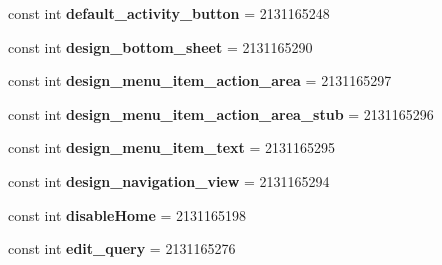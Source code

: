 \begin{DoxyCompactItemize}
\item 
\mbox{\label{class_pinned_app_1_1_droid_1_1_resource_1_1_id_aeffe138f86d5be554298f678e8cdbab4}} 
const int {\bfseries default\+\_\+activity\+\_\+button} = 2131165248
\item 
\mbox{\label{class_pinned_app_1_1_droid_1_1_resource_1_1_id_ab56706c0ed83d92cd51a507f29bf6399}} 
const int {\bfseries design\+\_\+bottom\+\_\+sheet} = 2131165290
\item 
\mbox{\label{class_pinned_app_1_1_droid_1_1_resource_1_1_id_a4d6b1c3ca4eb2c2961a7002a15781aa3}} 
const int {\bfseries design\+\_\+menu\+\_\+item\+\_\+action\+\_\+area} = 2131165297
\item 
\mbox{\label{class_pinned_app_1_1_droid_1_1_resource_1_1_id_a6e06368bdb53b192954d1e686c4df991}} 
const int {\bfseries design\+\_\+menu\+\_\+item\+\_\+action\+\_\+area\+\_\+stub} = 2131165296
\item 
\mbox{\label{class_pinned_app_1_1_droid_1_1_resource_1_1_id_af6c54398d3afab58063e1c4421161539}} 
const int {\bfseries design\+\_\+menu\+\_\+item\+\_\+text} = 2131165295
\item 
\mbox{\label{class_pinned_app_1_1_droid_1_1_resource_1_1_id_ad682231c715fb5272e69dd57b194e869}} 
const int {\bfseries design\+\_\+navigation\+\_\+view} = 2131165294
\item 
\mbox{\label{class_pinned_app_1_1_droid_1_1_resource_1_1_id_a530d2e2107f82026ee45a8f7b24ce9bc}} 
const int {\bfseries disable\+Home} = 2131165198
\item 
\mbox{\label{class_pinned_app_1_1_droid_1_1_resource_1_1_id_a3375e9a948de7381ced25ad556639ed8}} 
const int {\bfseries edit\+\_\+query} = 2131165276
\item 
\mbox{\label{class_pinned_app_1_1_droid_1_1_resource_1_1_id_aa4a607fe7f8c081e601665f2e6581ced}} 

\end{DoxyCompactItemize}
